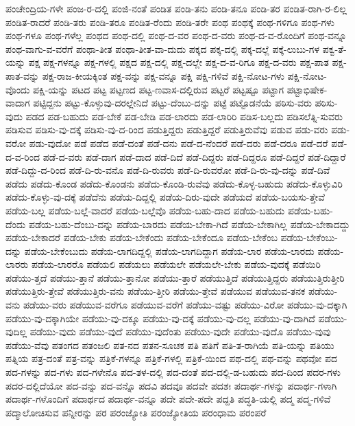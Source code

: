 {ಪಂಚೇಂದ್ರಿಯ-ಗಳೇ
ಪಂಜ-ರ-ದಲ್ಲಿ
ಪಂಜಿ-ನಂತೆ
ಪಂಡಿತ
ಪಂಡಿ-ತನು
ಪಂಡಿ-ತನೂ
ಪಂಡಿ-ತರ
ಪಂಡಿತ-ರಾಗಿ-ರ-ಲಿಲ್ಲ
ಪಂಡಿತ-ರಾದರೆ
ಪಂಡಿ-ತರು
ಪಂಡಿ-ತರೂ
ಪಂಡಿತ-ರೆಂದು
ಪಂಡಿ-ತರೇ
ಪಂಥ
ಪಂಥಕ್ಕೆ
ಪಂಥ-ಗಳಿಗೂ
ಪಂಥ-ಗಳು
ಪಂಥ-ಗಳೂ
ಪಂಥ-ಗಳೆಲ್ಲ
ಪಂಥದ
ಪಂಥ-ದಲ್ಲಿ
ಪಂಥ-ದ-ವರ
ಪಂಥ-ದ-ವರು
ಪಂಥ-ದ-ವ-ರೊಂದಿಗೆ
ಪಂಥ-ವನ್ನೂ
ಪಂಥ-ವಾಗು-ವ-ವರೆಗೆ
ಪಂಥಾ-ತೀತ
ಪಂಥಾ-ತೀತ-ವಾ-ದುದು
ಪಕ್ಕದ
ಪಕ್ಕ-ದಲ್ಲಿ
ಪಕ್ಕ-ದಲ್ಲೆ
ಪಕ್ಕೆ-ಲುಬು-ಗಳ
ಪಕ್ವ-ತೆ-ಯನ್ನು
ಪಕ್ಷ
ಪಕ್ಷ-ಗಳನ್ನೂ
ಪಕ್ಷ-ಗಳಲ್ಲಿ
ಪಕ್ಷದ
ಪಕ್ಷ-ದಲ್ಲಿ
ಪಕ್ಷ-ದಲ್ಲೇ
ಪಕ್ಷ-ದ-ವ-ರಿಗೂ
ಪಕ್ಷ-ದ-ವರು
ಪಕ್ಷ-ಪಾತ
ಪಕ್ಷ-ಪಾತ-ವನ್ನು
ಪಕ್ಷ-ರಾಜ-ಕೀಯಕ್ಕಿಂತ
ಪಕ್ಷ-ವನ್ನು
ಪಕ್ಷ-ವನ್ನೂ
ಪಕ್ಷಿ
ಪಕ್ಷಿ-ಗಳಿವೆ
ಪಕ್ಷಿ-ನೋಟ-ಗಳು
ಪಕ್ಷಿ-ನೋಟ-ವೊಂದು
ಪಕ್ಷಿ-ಯನ್ನು
ಪಟದ
ಪಟ್ಟ
ಪಟ್ಟಣದ
ಪಟ್ಟ-ಣವಾಸ-ದಲ್ಲಿರುವ
ಪಟ್ಟರೆ
ಪಟ್ಟಷ್ಟೂ
ಪಟ್ಟಾಗ
ಪಟ್ಟಾಭಿಷೇಕ-ವಾದಾಗ
ಪಟ್ಟಿದ್ದನು
ಪಟ್ಟು-ಕೊಳ್ಳುವು-ದರಲ್ಲೇನಿದೆ
ಪಟ್ಟು-ದೆಂಬು-ದನ್ನು
ಪಟ್ಟೆ
ಪಟ್ಟೊಡನೆಯೆ
ಪಠಿಸು-ವರು
ಪಠಿಸು-ವುದು
ಪಡದ
ಪಡ-ಬಹುದು
ಪಡ-ಬೇಕೆ
ಪಡ-ಬೇಡಿ
ಪಡ-ಲಾರದು
ಪಡ-ಲಾರಿರಿ
ಪಡಿಸ-ಬಲ್ಲದು
ಪಡಿಸಲೆತ್ನಿ-ಸುವರು
ಪಡಿಸುವ
ಪಡಿಸು-ವು-ದಕ್ಕೆ
ಪಡಿಸು-ವು-ದ-ರಿಂದ
ಪಡುತ್ತಿದ್ದರು
ಪಡುತ್ತಿದ್ದರೆ
ಪಡುತ್ತಿರುವೆವು
ಪಡುವ
ಪಡು-ವರು
ಪಡು-ವರೋ
ಪಡು-ವುದೋ
ಪಡೆ
ಪಡೆದ
ಪಡೆ-ದಂತೆ
ಪಡೆ-ದನು
ಪಡೆ-ದ-ನೆಂದರೆ
ಪಡೆ-ದರು
ಪಡೆ-ದರೂ
ಪಡೆ-ದರೆ
ಪಡೆ-ದ-ವ-ರಿಂದ
ಪಡೆ-ದ-ವರು
ಪಡೆ-ದಾಗ
ಪಡೆ-ದಾದ
ಪಡೆ-ದಿದೆ
ಪಡೆ-ದಿದ್ದರು
ಪಡೆ-ದಿದ್ದರೂ
ಪಡೆ-ದಿದ್ದರೆ
ಪಡೆ-ದಿದ್ದಾರೆ
ಪಡೆ-ದಿದ್ದು-ದ-ರಿಂದ
ಪಡೆ-ದಿ-ರು-ವನೊ
ಪಡೆ-ದಿ-ರುವರು
ಪಡೆ-ದಿ-ರುವರೋ
ಪಡೆ-ದಿ-ರು-ವು-ದನ್ನು
ಪಡೆ-ದಿವೆ
ಪಡೆದು
ಪಡೆದು-ಕೊಂಡ
ಪಡೆದು-ಕೊಂಡನು
ಪಡೆದು-ಕೊಂಡಿ-ರುವೆವು
ಪಡೆದು-ಕೊಳ್ಳ-ಬಹುದು
ಪಡೆದು-ಕೊಳ್ಳುವಿರಿ
ಪಡೆದು-ಕೊಳ್ಳು-ವು-ದಕ್ಕೆ
ಪಡೆದೆನು
ಪಡೆಯ-ದಿದ್ದಲ್ಲಿ
ಪಡೆಯ-ದಿರು-ವುದೇ
ಪಡೆಯದೆ
ಪಡೆಯ-ಬಯಸು-ತ್ತೇವೆ
ಪಡೆಯ-ಬಲ್ಲ
ಪಡೆಯ-ಬಲ್ಲೆ-ವಾದರೆ
ಪಡೆಯ-ಬಲ್ಲೆವೊ
ಪಡೆಯ-ಬಹು-ದಾದ
ಪಡೆಯ-ಬಹುದು
ಪಡೆಯ-ಬಹು-ದೆಂದು
ಪಡೆಯ-ಬಹು-ದೆಂಬು-ದನ್ನು
ಪಡೆಯ-ಬಾರದು
ಪಡೆಯ-ಬೇಕಾ-ಗಿದೆ
ಪಡೆಯ-ಬೇಕಾಗಿಲ್ಲ
ಪಡೆಯ-ಬೇಕಾದದ್ದು
ಪಡೆಯ-ಬೇಕಾದರೆ
ಪಡೆಯ-ಬೇಕು
ಪಡೆಯ-ಬೇಕೆಂದು
ಪಡೆಯ-ಬೇಕೆಂದೂ
ಪಡೆಯ-ಬೇಕೆಂಬ
ಪಡೆಯ-ಬೇಕೆಂಬು-ದನ್ನು
ಪಡೆಯ-ಬೇಕೆಂಬುದು
ಪಡೆಯ-ಲಾಗದಿದ್ದಲ್ಲಿ
ಪಡೆಯ-ಲಾಗದಿದ್ದಾಗ
ಪಡೆಯ-ಲಾರ
ಪಡೆಯ-ಲಾರದು
ಪಡೆಯ-ಲಾರರು
ಪಡೆಯ-ಲಾರರೊ
ಪಡೆಯಲಿ
ಪಡೆಯಲು
ಪಡೆಯಲೇ
ಪಡೆಯಲೇ-ಬೇಕು
ಪಡೆಯ-ವುದಕ್ಕೆ
ಪಡೆಯಿರಿ
ಪಡೆಯು-ತ್ತದೆ
ಪಡೆಯು-ತ್ತಾನೆ
ಪಡೆಯು-ತ್ತಾನೋ
ಪಡೆಯು-ತ್ತಾರೆ
ಪಡೆಯುತ್ತಿದೆ
ಪಡೆಯುತ್ತಿದ್ದರು
ಪಡೆಯುತ್ತಿರುತ್ತೀರಿ
ಪಡೆಯುತ್ತಿರು-ತ್ತೇವೆ
ಪಡೆಯುತ್ತಿರು-ವನು
ಪಡೆಯು-ತ್ತೀರಿ
ಪಡೆಯು-ತ್ತೇವೆ
ಪಡೆಯುವ
ಪಡೆಯುವ-ತನಕ
ಪಡೆಯು-ವನು
ಪಡೆಯು-ವರು
ಪಡೆಯುವ-ವರೆಗೂ
ಪಡೆಯುವ-ವರೆಗೆ
ಪಡೆಯು-ವಷ್ಟು
ಪಡೆಯು-ವಿರೋ
ಪಡೆಯು-ವು-ದಕ್ಕಾಗಿ
ಪಡೆಯು-ವು-ದಕ್ಕಾಗಿಯೇ
ಪಡೆಯು-ವು-ದಕ್ಕೂ
ಪಡೆಯು-ವು-ದಕ್ಕೆ
ಪಡೆಯು-ವು-ದಲ್ಲ
ಪಡೆಯು-ವು-ದಾಗಿದೆ
ಪಡೆಯು-ವುದಿಲ್ಲ
ಪಡೆಯು-ವುದು
ಪಡೆಯು-ವುದೆ
ಪಡೆಯು-ವುದೆಂತು
ಪಡೆಯು-ವುದೇ
ಪಡೆಯು-ವುದೊ
ಪಡೆಯು-ವುವು
ಪಡೆಯು-ವೆವು
ಪತಂಗದ
ಪತಂಜಲಿ
ಪತ-ನದ
ಪತನ-ಸೂಚಕ
ಪತಿ
ಪತಿಗೆ
ಪತಿ-ತ-ರಾಗಿಯೆ
ಪತಿ-ಯನ್ನು
ಪತಿಯು
ಪತ್ನಿಯ
ಪತ್ರ-ದಂತೆ
ಪತ್ರ-ವನ್ನು
ಪತ್ರಿಕೆ-ಗಳನ್ನೂ
ಪತ್ರಿಕೆ-ಗಳಲ್ಲಿ
ಪತ್ರಿಕೆ-ಯಿಂದ
ಪಥ-ದಲ್ಲಿ
ಪಥ-ವನ್ನು
ಪಥವೋ
ಪದ
ಪದ-ಗಳನ್ನು
ಪದ-ಗಳು
ಪದ-ಗಳೇನೊ
ಪದ-ತಳ-ದಲ್ಲಿ
ಪದ-ದಂತೆ
ಪದ-ದಲ್ಲಿ-ಡ-ಬಹುದು
ಪದ-ದಿಂದ
ಪದರ-ಗಳು
ಪದರ-ದಲ್ಲಿದೆಯೋ
ಪದ-ವನ್ನು
ಪದ-ವನ್ನೊ
ಪದವಿ
ಪದವೂ
ಪದವೇ
ಪದಶಃ
ಪದಾರ್ಥ-ಗಳನ್ನು
ಪದಾರ್ಥ-ಗಳಾಗಿ
ಪದಾರ್ಥ-ಗಳೊಂದಿಗೆ
ಪದಾರ್ಥದ
ಪದಾರ್ಥ-ವನ್ನೂ
ಪದೇ
ಪದೇ-ಪದೇ
ಪದ್ದತಿ
ಪದ್ಧತಿ-ಯಲ್ಲಿ
ಪದ್ಮ
ಪದ್ಮ-ಗಳಿವೆ
ಪದ್ಮಾಲೋಚಿಸುವ
ಪನ್ನೀರನ್ನು
ಪರ
ಪರಂಜ್ಯೋತಿ
ಪರಂಜ್ಯೋತಿಯ
ಪರಂಧಾಮ
ಪರಂಪರೆ
}

